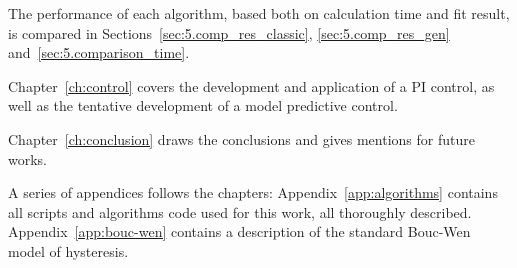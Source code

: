 The performance of each algorithm, based both on calculation time and fit result,
is compared in Sections~\ref{sec:5.comp_res_classic}, \ref{sec:5.comp_res_gen} and~\ref{sec:5.comparison_time}.

Chapter~\ref{ch:control} covers the development and application of a PI control,
as well as the tentative development of a model predictive control.

Chapter~\ref{ch:conclusion} draws the conclusions and gives mentions for future works.

A series of appendices follows the chapters: Appendix~\ref{app:algorithms} contains
all scripts and algorithms code used for this work, all thoroughly described.
Appendix~\ref{app:bouc-wen} contains a description
of the standard Bouc-Wen model of hysteresis.

